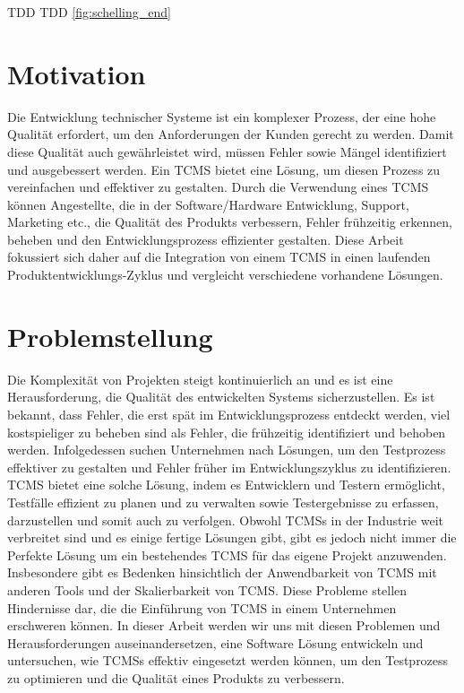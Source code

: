 \documentclass[a4paper, fontsize=11pt, parskip=half, twoside]{scrreprt}
\begin{document}
	\ac{TDD}
	\ac{TDD}
	\textcite{harman_well-wrought_2012}
	\cref{fig:schelling_end}
	
	\section{Motivation}
	Die Entwicklung technischer Systeme ist ein komplexer Prozess, der eine hohe Qualität erfordert, um den Anforderungen der Kunden gerecht zu werden. 
	Damit diese Qualität auch gewährleistet wird, müssen Fehler sowie Mängel identifiziert und ausgebessert werden. 
	Ein \ac{TCMS} bietet eine Lösung, um diesen Prozess zu vereinfachen und effektiver zu gestalten. 
	Durch die Verwendung eines \ac{TCMS} können Angestellte, die in der Software/Hardware Entwicklung, Support, Marketing etc., die Qualität des Produkts verbessern, Fehler frühzeitig erkennen, beheben und den Entwicklungsprozess effizienter gestalten. 
	Diese Arbeit fokussiert sich daher auf die Integration von einem \ac{TCMS} in einen laufenden Produktentwicklungs-Zyklus und vergleicht verschiedene vorhandene Lösungen.
	
	\section{Problemstellung}
	Die Komplexität von Projekten steigt kontinuierlich an und es ist eine Herausforderung, die Qualität des entwickelten Systems sicherzustellen. 
	Es ist bekannt, dass Fehler, die erst spät im Entwicklungsprozess entdeckt werden, viel kostspieliger zu beheben sind als Fehler, die frühzeitig identifiziert und behoben werden. 
	Infolgedessen suchen Unternehmen nach Lösungen, um den Testprozess effektiver zu gestalten und Fehler früher im Entwicklungszyklus zu identifizieren. 
	\ac{TCMS} bietet eine solche Lösung, indem es Entwicklern und Testern ermöglicht, Testfälle effizient zu planen und zu verwalten sowie Testergebnisse zu erfassen, darzustellen und somit auch zu verfolgen. 
	Obwohl \aclp{TCMS} in der Industrie weit verbreitet sind und es einige fertige Lösungen gibt, gibt es jedoch nicht immer die Perfekte Lösung um ein bestehendes \ac{TCMS} für das eigene Projekt anzuwenden. 
	Insbesondere gibt es Bedenken hinsichtlich der Anwendbarkeit von \ac{TCMS} mit anderen Tools und der Skalierbarkeit von \ac{TCMS}. 
	Diese Probleme stellen Hindernisse dar, die die Einführung von \ac{TCMS} in einem Unternehmen erschweren können. 
	In dieser Arbeit werden wir uns mit diesen Problemen und Herausforderungen auseinandersetzen, eine Software Lösung entwickeln und untersuchen, wie \aclp{TCMS} effektiv eingesetzt werden können, um den Testprozess zu optimieren und die Qualität eines Produkts zu verbessern.
	
\end{document}
